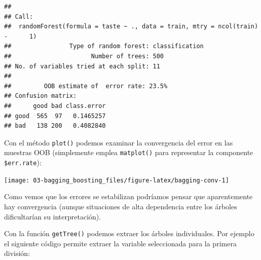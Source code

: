\documentclass[
  spanish,
]{book}
\newenvironment{Shaded}{\begin{snugshade}}{\end{snugshade}}
\newcommand{\CommentTok}[1]{\textcolor[rgb]{0.56,0.35,0.01}{\textit{#1}}}
\newcommand{\ControlFlowTok}[1]{\textcolor[rgb]{0.13,0.29,0.53}{\textbf{#1}}}
\newcommand{\DataTypeTok}[1]{\textcolor[rgb]{0.13,0.29,0.53}{#1}}
\newcommand{\DecValTok}[1]{\textcolor[rgb]{0.00,0.00,0.81}{#1}}
\newcommand{\KeywordTok}[1]{\textcolor[rgb]{0.13,0.29,0.53}{\textbf{#1}}}
\newcommand{\NormalTok}[1]{#1}
\newcommand{\OperatorTok}[1]{\textcolor[rgb]{0.81,0.36,0.00}{\textbf{#1}}}
\newcommand{\OtherTok}[1]{\textcolor[rgb]{0.56,0.35,0.01}{#1}}
\newcommand{\StringTok}[1]{\textcolor[rgb]{0.31,0.60,0.02}{#1}}
\theoremstyle{break}
\theoremstyle{definition}
\theoremstyle{definition}
\theoremstyle{definition}
\theoremstyle{remark}
\begin{document}
\begin{verbatim}
## 
## Call:
##  randomForest(formula = taste ~ ., data = train, mtry = ncol(train) -      1) 
##                Type of random forest: classification
##                      Number of trees: 500
## No. of variables tried at each split: 11
## 
##         OOB estimate of  error rate: 23.5%
## Confusion matrix:
##      good bad class.error
## good  565  97   0.1465257
## bad   138 200   0.4082840
\end{verbatim}

Con el método \texttt{plot()} podemos examinar la convergencia del error en las muestras OOB (simplemente emplea \texttt{matplot()} para representar la componente \texttt{\$err.rate}):

\begin{Shaded}
\end{Shaded}

\begin{center}\texttt{[image: 03-bagging\_boosting\_files/figure-latex/bagging-conv-1]} \end{center}

Como vemos que los errores se estabilizan podríamos pensar que aparentemente hay convergencia (aunque situaciones de alta dependencia entre los árboles dificultarían su interpretación).

Con la función \texttt{getTree()} podemos extraer los árboles individuales.
Por ejemplo el siguiente código permite extraer la variable seleccionada para la primera división:

\begin{Shaded}
\end{Shaded}
\end{document}
